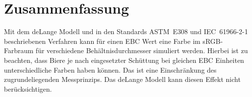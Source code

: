 \documentclass[10pt,a4paper,DIV=12,parskip=half]{scrarticle}
\begin{document}
\section*{Zusammenfassung}

Mit dem deLange Modell und in den Standards ASTM~E308 und IEC~61966-2-1 beschriebenen Verfahren kann für einen EBC Wert eine Farbe im sRGB-Farbraum für verschiedene Behältnisdurchmesser simuliert werden. Hierbei ist zu beachten, dass Biere je nach eingesetzter Schüttung bei gleichen EBC Einheiten unterschiedliche Farben haben können. Das ist eine Einschränkung des zugrundeliegenden Messprinzips. Das deLange Modell kann diesen Effekt nicht berücksichtigen.

\printbibliography[title=Quellen]
\end{document}
